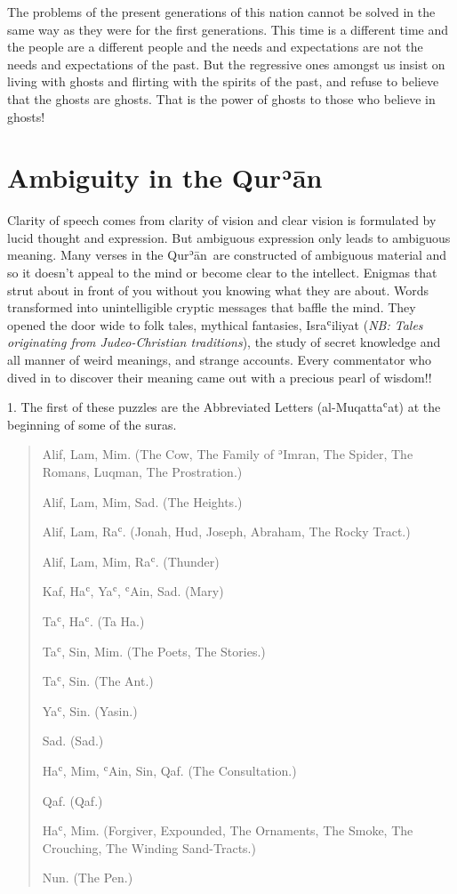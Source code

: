 \documentclass[12pt]{memoir}
\def\´{ʾ} %
\def\`{ʿ} %
\newcommand{\ar}[1]{\RL{\arabicfont#1}}
\def \Quran{Qur\-\´ān} %
\def\–{-\hskip0pt}
\def\pardivider{\centerline{\ar{۞۞۞}}} %
\newcommand{\NB}[1]{\emph{\small NB: #1}}
\begin{document}
The problems of the present generations of this nation cannot be solved
in the same way as they were for the first generations.
This time is a different time and the people are a different people
and the needs and expectations are not the needs and expectations of the past.
But the regressive ones amongst us insist on living with ghosts
and flirting with the spirits of the past,
and refuse to believe that the ghosts are ghosts.
That is the power of ghosts to those who believe in ghosts!

\pardivider


\section{Ambiguity in the \Quran}

Clarity of speech comes from clarity of vision
and clear vision is formulated by lucid thought and expression.
But ambiguous expression only leads to ambiguous meaning.
Many verses in the \Quran\ are constructed of ambiguous material
and so it doesn’t appeal to the mind or become clear to the intellect.
Enigmas that strut about in front of you
without you knowing what they are about.
Words transformed into unintelligible cryptic messages that baffle the mind.
They opened the door wide to folk tales, mythical fantasies, Isra\`iliyat
(\NB{Tales originating from Judeo\–Christian traditions}),
the study of secret knowledge and all manner of weird meanings,
and strange accounts.
Every commentator who dived in to discover their meaning
came out with a precious pearl of wisdom!!

1. The first of these puzzles are the Abbreviated Letters (al\–Muqatta\`at)
at the beginning of some of the suras.

\begin{quote}
Alif, Lam, Mim.
(The Cow, The Family of \´Imran, The Spider,
The Romans, Luqman, The Prostration.)

Alif, Lam, Mim, Sad. (The Heights.)

Alif, Lam, Ra\`.
(Jonah, Hud, Joseph, Abraham, The Rocky Tract.)

Alif, Lam, Mim, Ra\`. (Thunder)

Kaf, Ha\`, Ya\`, \`Ain, Sad. (Mary)

Ta\`, Ha\`. (Ta Ha.)

Ta\`, Sin, Mim. (The Poets, The Stories.)

Ta\`, Sin. (The Ant.)

Ya\`, Sin. (Yasin.)

Sad. (Sad.)

Ha\`, Mim, \`Ain, Sin, Qaf. (The Consultation.)

Qaf. (Qaf.)

Ha\`, Mim.
(Forgiver, Expounded, The Ornaments, The Smoke,
The Crouching, The Winding Sand-Tracts.)

Nun. (The Pen.)
\end{quote}
\end{document}
